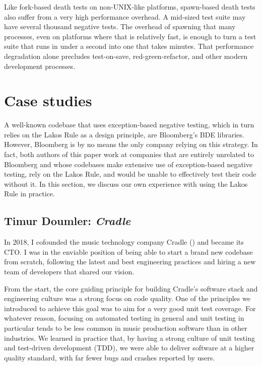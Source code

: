 Like fork-based death tests on non-UNIX-like platforms, spawn-based death tests also suffer from a very high performance overhead. A mid-sized test suite may have several thousand negative tests. The overhead of spawning that many processes, even on platforms where that is relatively fast, is enough to turn a test suite that runs in under a second into one that takes minutes. That performance degradation alone precludes test-on-save, red-green-refactor, and other modern development processes.

\section{Case studies}
\label{sec:casestudies}

A well-known codebase that uses exception-based negative testing, which in turn relies on the Lakos Rule as a design principle, are Bloomberg's BDE libraries. However, Bloomberg is by no means the only company relying on this strategy. In fact, both authors of this paper work at companies that are entirely unrelated to Bloomberg and whose codebases make extensive use of exception-based negative testing, rely on the Lakos Rule, and would be unable to effectively test their code without it. In this section, we discuss our own experience with using the Lakos Rule in practice.

\subsection{Timur Doumler: \emph{Cradle}}

In 2018, I cofounded the music technology company Cradle (\hyperref[https://cradle.app]{}) and became its CTO. I was in the enviable position of being able to start a brand new codebase from scratch, following the latest and best engineering practices and hiring a new team of developers that shared our vision.

From the start, the core guiding principle for building Cradle's software stack and engineering culture was a strong focus on code quality. One of the principles we introduced to achieve this goal was to aim for a very good unit test coverage. For whatever reason, focusing on automated testing in general and unit testing in particular tends to be less common in  music production software than in other industries. We learned in practice that, by having a strong culture of unit testing and test-driven development (TDD), we were able to deliver software at a higher quality standard, with far fewer bugs and crashes reported by users.

